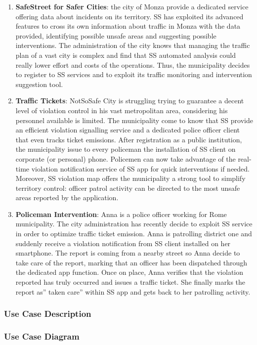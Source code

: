 \begin{enumerate}
\item \textbf{SafeStreet for Safer Cities}: the city of Monza provide a dedicated service offering data about incidents on its territory. SS has exploited its advanced features to cross its own information about traffic in Monza with the data provided, identifying possible unsafe areas and suggesting possible interventions. The administration of the city knows that managing the traffic plan of a vast city is complex and find that SS automated analysis could really lower effort and costs of the operations. Thus, the municipality decides to register to SS services and to exploit its traffic monitoring and intervention suggestion tool. 
\item \textbf{Traffic Tickets}: NotSoSafe City is struggling trying to guarantee a decent level of violation control in his vast metropolitan area, considering his personnel available is limited. The municipality come to know that SS provide an efficient violation signalling service and a dedicated police officer client that even tracks ticket emissions. After registration as a public institution, the municipality issue to every policeman the installation of SS client on corporate (or personal) phone. Policemen can now take advantage of the real-time violation notification service of SS app for quick interventions if needed. Moreover, SS violation map offers the municipality a strong tool to simplify territory control: officer patrol activity can be directed to the most unsafe areas reported by the application.
\item  \textbf{Policeman Intervention}: Anna is a police officer working for Rome municipality. The city administration has recently decide to exploit SS service in order to optimize traffic ticket emission. Anna is patrolling district one and suddenly receive a violation notification from SS client installed on her smartphone. The report is coming from a nearby street so Anna decide to take care of the report, marking that an officer has been dispatched  through the dedicated app function. Once on place, Anna verifies that the violation reported has truly occurred and issues a traffic ticket. She finally marks the report as” taken care” within SS app and gets back to her patrolling activity.

	\end{enumerate}
	\subsubsection{Use Case Description}
	\subsubsection{Use Case Diagram}
